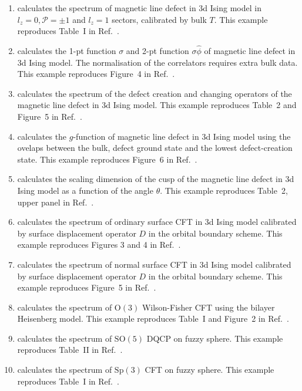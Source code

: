 \documentclass{timesjhep}
\begin{document}
\begin{enumerate}
    \item {} calculates the spectrum of magnetic line defect in 3d Ising model in $l_z=0,\mathcal{P}=\pm 1$ and $l_z = 1$ sectors, calibrated by bulk $T$. This example reproduces Table~I in Ref.~\cite{Hu2023Aug}.
    \item {} calculates the 1-pt function $\sigma$ and 2-pt function $\sigma\hat{\phi}$ of magnetic line defect in 3d Ising model. The normalisation of the correlators requires extra bulk data. This example reproduces Figure~4 in Ref.~\cite{Hu2023Aug}.
    \item {} calculates the spectrum of the defect creation and changing operators of the magnetic line defect in 3d Ising model. This example reproduces Table~2 and Figure~5 in Ref.~\cite{Zhou2024Jan}.
    \item {} calculates the $g$-function of magnetic line defect in 3d Ising model using the ovelaps between the bulk, defect ground state and the lowest defect-creation state. This example reproduces Figure~6 in Ref.~\cite{Zhou2024Jan}.
    \item {} calculates the scaling dimension of the cusp of the magnetic line defect in 3d Ising model as a function of the angle $\theta$. This example reproduces Table~2, upper panel in Ref.~\cite{Cuomo2024}.
    \item {} calculates the spectrum of ordinary surface CFT in 3d Ising model calibrated by surface displacement operator $D$ in the orbital boundary scheme. This example reproduces Figures 3 and 4 in Ref.~\cite{Zhou2024Jul}.
    \item {} calculates the spectrum of normal surface CFT in 3d Ising model calibrated by surface displacement operator $D$ in the orbital boundary scheme. This example reproduces Figure~5 in Ref.~\cite{Zhou2024Jul}.
    \item {} calculates the spectrum of $\mathrm{O}(3)$ Wilson-Fisher CFT using the bilayer Heisenberg model. This example reproduces Table~I and Figure~2 in Ref.~\cite{Han2023Dec}.
    \item {} calculates the spectrum of $\mathrm{SO}(5)$ DQCP on fuzzy sphere. This example reproduces Table~II in Ref.~\cite{Zhou2023}.
    \item {} calculates the spectrum of $\mathrm{Sp}(3)$ CFT on fuzzy sphere. This example reproduces Table~I in Ref.~\cite{Zhou2024Oct}.

\end{enumerate}
\end{document}
